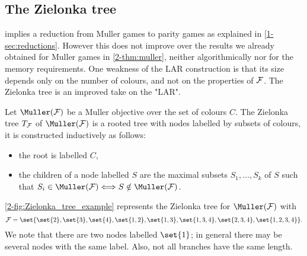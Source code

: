 \subsection*{The Zielonka tree}
 implies a reduction from Muller games to parity games as explained in \cref{1-sec:reductions}.
However this does not improve over the results we already obtained for Muller games in \cref{2-thm:muller},
neither algorithmically nor for the memory requirements.
One weakness of the LAR construction is that its size depends only on the number of colours, and not on the properties of $\mathcal{F}$.
The Zielonka tree is an improved take on the "LAR".

\begin{definition}
\label{definition:zielonka_tree}
Let $\Muller(\F)$ be a Muller objective over the set of colours $C$.
The Zielonka tree $T_{\mathcal{F}}$ of $\Muller(\F)$ is a rooted tree with nodes labelled by subsets of colours, 
it is constructed inductively as follows:
\begin{itemize}
	\item the root is labelled $C$,
	\item the children of a node labelled $S$ are the maximal subsets $S_1, \dots, S_k$ of $S$ such that 
	$S_i \in \Muller(\F) \Longleftrightarrow S \notin \Muller(\F)$.
\end{itemize}
\end{definition}


\cref{2-fig:Zielonka_tree_example} represents the Zielonka tree for $\Muller(\F)$ with 
\[
\F = \set{\set{2}, \set{3}, \set{4}, \set{1,2}, \set{1,3}, \set{1,3,4}, \set{2,3,4}, \set{1,2,3,4}}.
\]
We note that there are two nodes labelled $\set{1}$; in general there may be several nodes with the same label.
Also, not all branches have the same length.


